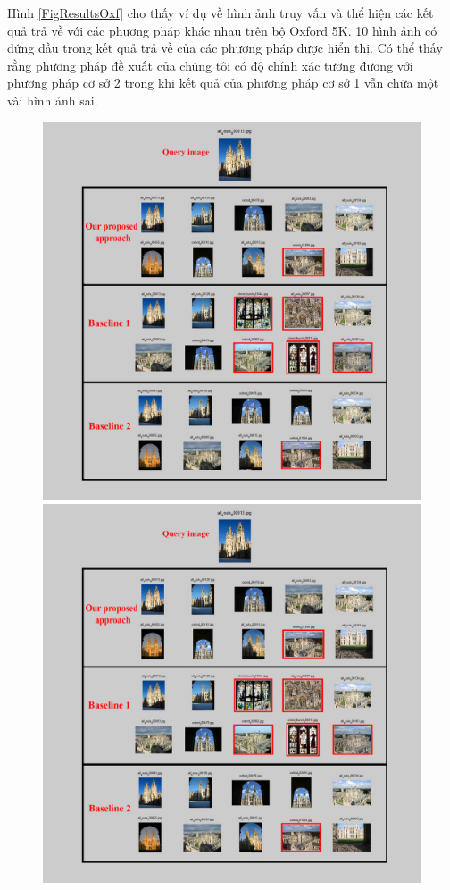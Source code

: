 Hình \ref{FigResultsOxf} cho thấy ví dụ về hình ảnh truy vấn và thể hiện các kết quả trả về với các phương pháp khác nhau trên bộ Oxford 5K. 10 hình ảnh có đứng đầu trong kết quả trả về của các phương pháp được hiển thị. Có thể thấy rằng phương pháp đề xuất của chúng tôi có độ chính xác tương đương với phương pháp cơ sở 2 trong khi kết quả của phương pháp cơ sở 1 vẫn chứa một vài hình ảnh sai.


\begin{figure}[!htbp]
  \begin{center}
    \leavevmode
    \ifpdf
      \includegraphics[scale=0.25]{resOxford5k}
    \else
      \includegraphics[scale=0.25]{resOxford5k}

\end{center}
\end{figure}
